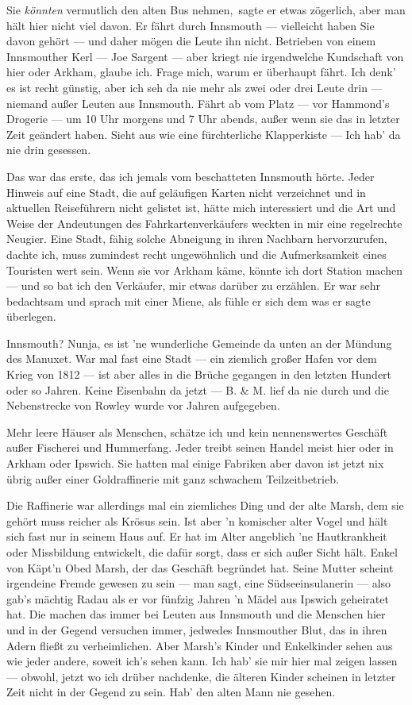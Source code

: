 \glqq Sie \textit{könnten} vermutlich den alten Bus nehmen,\grqq\ sagte er etwas zögerlich, \glqq aber man hält hier nicht viel davon. Er fährt durch Innsmouth --- vielleicht haben Sie davon gehört --- und daher mögen die Leute ihn nicht. Betrieben von einem Innsmouther Kerl --- Joe Sargent --- aber kriegt nie irgendwelche Kundschaft von hier oder Arkham, glaube ich. Frage mich, warum er überhaupt fährt. Ich denk' es ist recht günstig, aber ich seh da nie mehr als zwei oder drei Leute drin --- niemand außer Leuten aus Innsmouth. Fährt ab vom Platz --- vor Hammond's Drogerie --- um 10 Uhr morgens und 7 Uhr abends, außer wenn sie das in letzter Zeit geändert haben. Sieht aus wie eine fürchterliche Klapperkiste --- Ich hab' da nie drin gesessen.\grqq

Das war das erste, das ich jemals vom beschatteten Innsmouth hörte. Jeder Hinweis auf eine Stadt, die auf geläufigen Karten nicht verzeichnet und in aktuellen Reiseführern nicht gelistet ist, hätte mich interessiert und die Art und Weise der Andeutungen des Fahrkartenverkäufers weckten in mir eine regelrechte Neugier. Eine Stadt, fähig solche Abneigung in ihren Nachbarn hervorzurufen, dachte ich, muss zumindest recht ungewöhnlich und die Aufmerksamkeit eines Touristen wert sein. Wenn sie vor Arkham käme, könnte ich dort Station machen --- und so bat ich den Verkäufer, mir etwas darüber zu erzählen. Er war sehr bedachtsam und sprach mit einer Miene, als fühle er sich dem was er sagte überlegen.

\glqq Innsmouth? Nunja, es ist 'ne wunderliche Gemeinde da unten an der Mündung des Manuxet. War mal fast eine Stadt --- ein ziemlich großer Hafen vor dem Krieg von 1812 --- ist aber alles in die Brüche gegangen in den letzten Hundert oder so Jahren. Keine Eisenbahn da jetzt --- B. \& M. lief da nie durch und die Nebenstrecke von Rowley wurde vor Jahren aufgegeben.

Mehr leere Häuser als Menschen, schätze ich und kein nennenswertes Geschäft außer Fischerei und Hummerfang. Jeder treibt seinen Handel meist hier oder in Arkham oder Ipswich. Sie hatten mal einige Fabriken aber davon ist jetzt nix übrig außer einer Goldraffinerie mit ganz schwachem Teilzeitbetrieb.

Die Raffinerie war allerdings mal ein ziemliches Ding und der alte Marsh, dem sie gehört muss reicher als Krösus sein. Ist aber 'n komischer alter Vogel und hält sich fast nur in seinem Haus auf. Er hat im Alter angeblich 'ne Hautkrankheit oder Missbildung entwickelt, die dafür sorgt, dass er sich außer Sicht hält. Enkel von Käpt'n Obed Marsh, der das Geschäft begründet hat. Seine Mutter scheint irgendeine Fremde gewesen  zu sein --- man sagt, eine Südseeinsulanerin --- also gab's mächtig Radau als er vor fünfzig Jahren 'n Mädel aus Ipswich geheiratet hat. Die machen das immer bei Leuten aus Innsmouth und die Menschen hier und in der Gegend versuchen immer, jedwedes Innsmouther Blut, das in ihren Adern fließt zu verheimlichen. Aber Marsh's Kinder und Enkelkinder sehen aus wie jeder andere, soweit ich's sehen kann. Ich hab' sie mir hier mal zeigen lassen --- obwohl, jetzt wo ich drüber nachdenke, die älteren Kinder scheinen in letzter Zeit nicht in der Gegend zu sein. Hab' den alten Mann nie gesehen.

